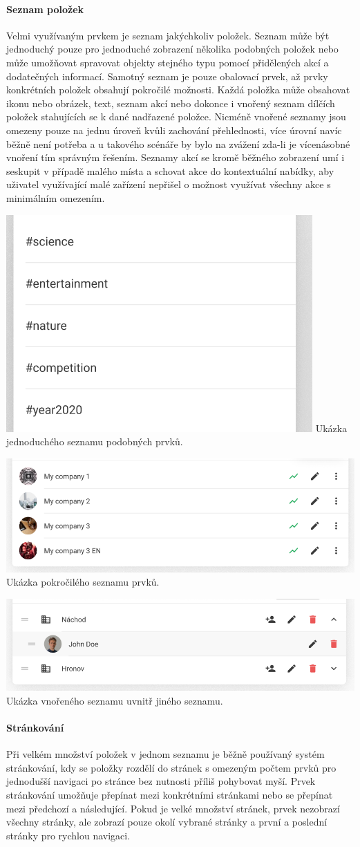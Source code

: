 \begin{itemize}
\begin{itemize}
			\paragraph{Seznam položek}

			Velmi využívaným prvkem je seznam jakýchkoliv položek.
			Seznam může být jednoduchý pouze pro jednoduché zobrazení několika podobných položek nebo může umožňovat
			spravovat objekty stejného typu pomocí přidělených akcí a dodatečných informací.
			Samotný seznam je pouze obalovací prvek, až prvky konkrétních položek obsahují pokročilé možnosti.
			Každá položka může obsahovat ikonu nebo obrázek, text, seznam akcí nebo dokonce i vnořený seznam dílčích
			položek stahujících se k dané nadřazené položce.
			Nicméně vnořené seznamy jsou omezeny pouze na jednu úroveň kvůli zachování přehlednosti, více úrovní navíc
			běžně není potřeba a u takového scénáře by bylo na zvážení zda-li je vícenásobné vnoření tím správným řešením.
			Seznamy akcí se kromě běžného zobrazení umí i seskupit v případě malého místa a schovat akce do kontextuální
			nabídky, aby uživatel využívající malé zařízení nepřišel o možnost využívat všechny akce s minimálním omezením.

			\includegraphics[width=0.24\linewidth]{obrazky/jednoduchy_seznam}\hfill
			Ukázka jednoduchého seznamu podobných prvků. %

			\includegraphics[width=0.24\linewidth]{obrazky/seznam}\hfill
			Ukázka pokročilého seznamu prvků. %

			\includegraphics[width=0.24\linewidth]{obrazky/vnoreny_seznam}\hfill
			Ukázka vnořeného seznamu uvnitř jiného seznamu. %

			\paragraph{Stránkování}

			Při velkém množství položek v jednom seznamu je běžně používaný systém stránkování, kdy se položky rozdělí
			do stránek s omezeným počtem prvků pro jednodušší navigaci po stránce bez nutnosti příliš pohybovat myší.
			Prvek stránkování umožňuje přepínat mezi konkrétními stránkami nebo se přepínat mezi předchozí a následující.
			Pokud je velké množství stránek, prvek nezobrazí všechny stránky, ale zobrazí pouze okolí vybrané stránky
			a první a poslední stránky pro rychlou navigaci.


\end{itemize}
\end{itemize}

